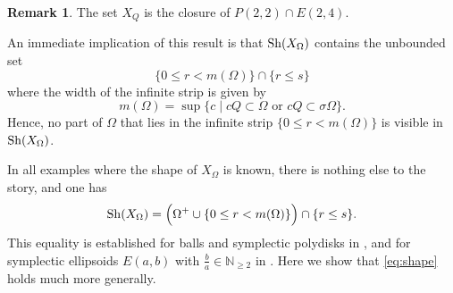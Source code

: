 \documentclass[12pt]{amsart}
\newtheorem{corollary}[theorem]{Corollary}
\newtheorem{question}[theorem]{Question}
\theoremstyle{definition}
\newtheorem{remark}[theorem]{Remark}
\newcommand{\RR}{{\mathbb R}}
\newcommand{\NN}{{\mathbb N}}
\begin{document}
\begin{remark}
    The set $X_Q$ is the closure of $P(2,2) \cap E(2,4).$
\end{remark}












An immediate implication of this result is that 
${\rm Sh}(X_{\Omega})$ contains the unbounded set $$\{0\leq r < m(\Omega)\} \cap \{r\leq s\} $$ where the width of the infinite strip is given by $$m(\Omega) = \sup \{ c \mid cQ \subset \Omega \, \, \mathrm{or} \, \, cQ \subset \sigma \Omega \}.$$ Hence, no part of $\Omega$ that lies in the infinite strip $\{0\leq r < m(\Omega)\}$ is visible in ${\rm Sh}(X_{\Omega})$.

\bigskip

In all examples where the shape of $X_{\Omega}$ is known, there is nothing else to the story, and one has
\begin{equation}\label{eq:shape}
    {\rm Sh}(X_{\Omega}) = \Bigl(\Omega^+  \cup \{0\leq r < m(\Omega)\} \Bigr)\cap \{r\leq s\}.
\end{equation} This equality is  established for balls and symplectic polydisks in \cite{ho}, and for symplectic ellipsoids $E(a,b)$ with $\frac{b}{a} \in \NN_{\geq 2}$ in \cite{hizh}.
Here we show that \eqref{eq:shape} holds much more generally. 
\end{document}
